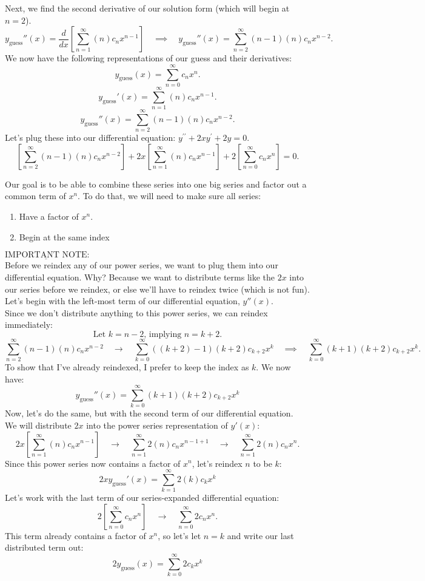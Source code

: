 \documentclass[a4paper,12pt]{article} %
\begin{document}
Next, we find the second derivative of our solution form (which will begin at $n=2$).
$$ y_{\text{guess}}''(x) = \frac{d}{dx}\left[\sum_{n=1}^{\infty} (n)c_nx^{n-1}\right] \quad\implies\quad y_{\text{guess}}''(x)= \sum_{n=2}^{\infty} (n-1)(n)c_nx^{n-2}. $$
We now have the following representations of our guess and their derivatives:
$$ y_{\text{guess}}(x) = \sum_{n=0}^{\infty} c_nx^n. $$
$$ y_{\text{guess}}'(x) = \sum_{n=1}^{\infty} (n)c_nx^{n-1}. $$
$$ y_{\text{guess}}''(x)= \sum_{n=2}^{\infty} (n-1)(n)c_nx^{n-2}. $$
Let's plug these into our differential equation: $y^{\prime \prime}+2 x y^{\prime}+2 y=0.$
$$ \left[\sum_{n=2}^{\infty} (n-1)(n)c_nx^{n-2}\right] + 2x\left[\sum_{n=1}^{\infty} (n)c_nx^{n-1}\right] + 2\left[\sum_{n=0}^{\infty} c_nx^n\right]=0. $$
\pagebreak

Our goal is to be able to combine these series into one big series and factor out a common term of $x^n$. To do that, we will need to make sure all series:

\begin{enumerate}
	\item Have a factor of $x^n$.
	\item Begin at the same index
\end{enumerate}

$\boxed{\underline{\text{IMPORTANT NOTE}}}:$\\

 Before we reindex any of our power series, we want to plug them into our differential equation. Why? Because we want to distribute terms like the $2x$ into our series before we reindex, or else we'll have to reindex twice (which is not fun).\\
 
 Let's begin with the left-most term of our differential equation, $y''(x)$.\\
 
Since we don't distribute anything to this power series, we can reindex immediately:
$$ \text{Let }k = n-2 \text{, implying } n = k+2. $$
$$ \sum_{n=2}^{\infty} (n-1)(n)c_nx^{n-2} \quad\rightarrow\quad \sum_{k=0}^{\infty} ((k+2)-1)(k+2)c_{k+2}x^{k} \quad\implies\quad \sum_{k=0}^{\infty} (k+1)(k+2)c_{k+2}x^{k}.$$
To show that I've already reindexed, I prefer to keep the index as $k$. We now have:
$$ y_{\text{guess}}''(x) = \sum_{k=0}^{\infty} (k+1)(k+2)c_{k+2}x^{k} $$
Now, let's do the same, but with the second term of our differential equation.\\
 
 We will distribute $2x$ into the power series representation of $y'(x)$:
 $$ 2x\left[\sum_{n=1}^{\infty} (n)c_nx^{n-1}\right] \quad\rightarrow\quad \sum_{n=1}^{\infty} 2(n)c_nx^{n-1 + 1} \quad\rightarrow\quad \sum_{n=1}^{\infty} 2(n)c_nx^{n}. $$
 Since this power series now contains a factor of $x^n$, let's reindex $n$ to be $k$:
 $$ 2xy_{\text{guess}}'(x) = \sum_{k=1}^{\infty} 2(k)c_kx^{k}$$ 
 Let's work with the last term of our series-expanded differential equation:
 $$ 2\left[\sum_{n=0}^{\infty} c_nx^n\right] \quad\rightarrow\quad \sum_{n=0}^{\infty} 2c_nx^n. $$ 
 This term already contains a factor of $x^n$, so let's let $n = k$ and write our last distributed term out:
 $$ 2y_{\text{guess}}(x) =  \sum_{k=0}^{\infty} 2c_kx^k $$
 
\end{document}
